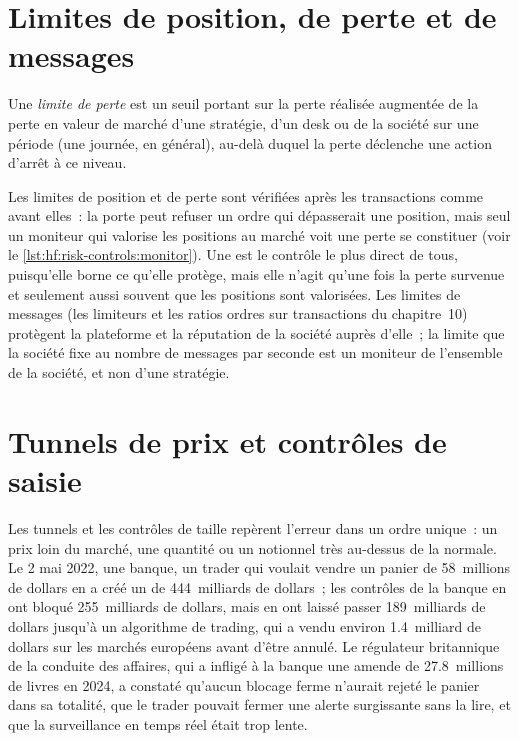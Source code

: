 \section{Limites de position, de perte et de messages}

\begin{definition}\label{def:hf:risk-controls:loss}
Une \emph{limite de perte} est un seuil portant sur la perte réalisée augmentée de la perte en valeur de marché d'une stratégie, d'un desk ou de la société sur une période (une journée,
en général), au-delà duquel la perte déclenche une action d'arrêt à ce niveau.
\end{definition}

Les limites de position et de perte sont vérifiées après les transactions comme avant elles~: la porte peut refuser un ordre qui dépasserait une position, mais seul un
moniteur qui valorise les positions au marché voit une perte se constituer (voir le \cref{lst:hf:risk-controls:monitor}). Une  est le contrôle le plus direct de tous,
puisqu'elle borne ce qu'elle protège, mais elle n'agit qu'une fois la perte survenue et seulement aussi souvent que les positions sont valorisées. Les limites de messages
(les limiteurs et les ratios ordres sur transactions du chapitre~10) protègent la plateforme et la réputation de la société auprès d'elle~; la limite que la société fixe au nombre de messages par seconde est un
moniteur de l'ensemble de la société, et non d'une stratégie.

\section{Tunnels de prix et contrôles de saisie}

Les tunnels et les contrôles de taille repèrent l'erreur dans un ordre unique~: un prix loin du marché, une quantité ou un notionnel très au-dessus de la normale. Le 2 mai 2022, une
banque, un trader qui voulait vendre un panier de 58~millions de dollars en a créé un de 444~milliards de dollars~; les contrôles de la banque en ont bloqué 255~milliards de dollars, mais en ont laissé passer
189~milliards de dollars jusqu'à un algorithme de trading, qui a vendu environ 1.4~milliard de dollars sur les marchés européens avant d'être annulé. Le régulateur britannique de la conduite des affaires, qui
a infligé à la banque une amende de 27.8~millions de livres en 2024, a constaté qu'aucun blocage ferme n'aurait rejeté le panier dans sa totalité, que le trader pouvait fermer une alerte surgissante
sans la lire, et que la surveillance en temps réel était trop lente.

